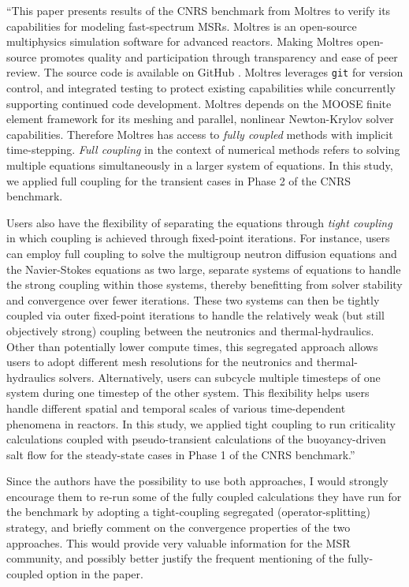 \documentclass[answers,12pt]{exam}
\begin{document}
\begin{questions}
\begin{solution}
        	``This paper presents results of the CNRS benchmark from Moltres
to verify its capabilities for modeling fast-spectrum \glspl{MSR}. Moltres
is an open-source multiphysics simulation software for advanced reactors.
Making Moltres open-source promotes quality and participation through
transparency and ease of peer review. The source code
\cite{lindsay_moltres_2017} is available on GitHub \cite{github_build_2017}.
Moltres leverages \texttt{git} for version control, and integrated testing to
protect existing capabilities while concurrently supporting continued code
development. Moltres depends on the \gls{MOOSE} finite element framework for
its meshing and parallel, nonlinear Newton-Krylov solver capabilities.
Therefore Moltres has access to \textit{fully coupled} methods with implicit
time-stepping. \textit{Full coupling} in the context of numerical methods
refers to solving multiple equations simultaneously in a larger system of
equations. In this study, we applied full coupling for the transient
cases in Phase 2 of the CNRS benchmark.

Users also have the flexibility of separating the equations through
\textit{tight coupling} in which coupling is achieved through
fixed-point iterations. For instance, users can employ full coupling to solve
the multigroup neutron diffusion equations and the Navier-Stokes equations as
two large, separate systems of equations to handle the strong coupling within
those systems, thereby benefitting from solver stability and convergence
over fewer iterations. These two systems can then be tightly coupled via outer
fixed-point iterations to handle the relatively weak (but still objectively
strong) coupling between the neutronics and thermal-hydraulics. Other than
potentially lower compute times, this segregated approach allows users to adopt
different mesh resolutions for the neutronics and thermal-hydraulics solvers.
Alternatively, users can subcycle multiple timesteps of one system during one
timestep of the other system. This flexibility helps users handle different
spatial and temporal scales of various
time-dependent phenomena in reactors. In this study, we applied tight coupling
to run criticality calculations coupled with pseudo-transient calculations of
the buoyancy-driven salt flow for the steady-state cases in Phase 1 of the CNRS
benchmark.''
        \end{solution}
        
        \question Since the authors have the possibility to use both approaches, I would strongly encourage them to re-run some of the fully coupled calculations they have run for the benchmark by adopting a tight-coupling segregated (operator-splitting) strategy, and briefly comment on the convergence properties of the two approaches. This would provide very valuable information for the MSR community, and possibly better justify the
frequent mentioning of the fully-coupled option in the paper.


\end{questions}
\end{document}
